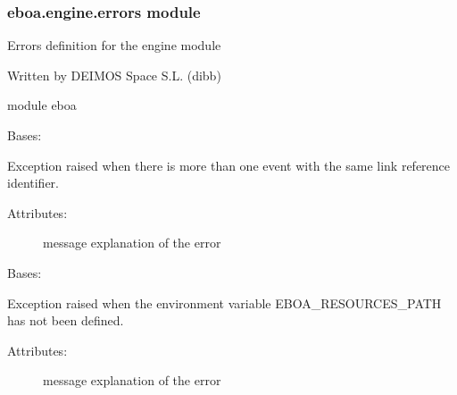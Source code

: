\subsubsection{eboa.engine.errors module}
\label{\detokenize{eboa.engine:module-eboa.engine.errors}}\label{\detokenize{eboa.engine:eboa-engine-errors-module}}
Errors definition for the engine module

Written by DEIMOS Space S.L. (dibb)

module eboa

\begin{fulllineitems}
\label{\detokenize{eboa.engine:eboa.engine.errors.DuplicatedEventLinkRef}}
Bases: {\hyperref[\detokenize{eboa.engine:eboa.engine.errors.Error}]{}}

Exception raised when there is more than one event with the same link reference identifier.
\begin{description}
\item[{Attributes:}] \leavevmode
message \textendash{} explanation of the error

\end{description}

\end{fulllineitems}


\begin{fulllineitems}
\label{\detokenize{eboa.engine:eboa.engine.errors.EboaResourcesPathNotAvailable}}
Bases: {\hyperref[\detokenize{eboa.engine:eboa.engine.errors.Error}]{}}

Exception raised when the environment variable EBOA\_RESOURCES\_PATH has not been defined.
\begin{description}
\item[{Attributes:}] \leavevmode
message \textendash{} explanation of the error

\end{description}

\end{fulllineitems}

